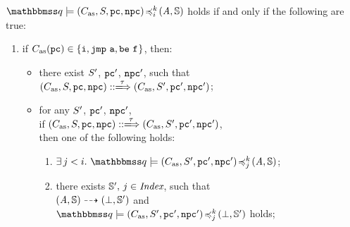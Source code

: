 \begin{definition}
    \label{def:sim-imp-prim-state}
    {\em $\simFunctionSt{\relastQ}{(\asmimp, \state, \pc, \npc)}{i}{k}{(\primcom, \hpstate)}$}
    holds if and only if the following are true:
    \small
    \begin{enumerate}[1.]
        \item if {\em $C_{\text{as}}(\texttt{pc}) \in \{ \texttt{i}, \texttt{jmp}{} \ \texttt{a}, \texttt{be} \ \texttt{f}_{} \}$}, then:
            \begin{itemize}
                \item there exist {\em $S'$}, {\em $\texttt{pc}'$}, {\em $\texttt{npc}'$},
                    such that \\
                    {\em $\LGlobTrans{(\asmimp, \state, \pc, \npc)}{\empmsg\,}
                            {(\asmimp, \state', \pc', \npc')}$};
                \item for any $S'$, {\em $\texttt{pc}'$}, {\em $\texttt{npc}'$}, \\
                    if
                    {\em $\LGlobTrans{(\asmimp, \state, \pc, \npc)}{\empmsg\,}
                            {(\asmimp, \state', \pc', \npc')}$}, \\ then one of
                        the following holds:
                    \begin{enumerate}
                        \item {\em $\exists \, j < i. \
                            \simFunctionSt{\relastQ}{(\asmimp, \state', \pc', \npc')}
                                {j}{k}{(\primcom, \hpstate)}$};
                        \item there exists $\mathbb{S}', \, j \in \textit{Index}$,
                            such that \\
                            ${(\textit{A}, \mathbb{S})} \dashrightarrow {(\perp, \mathbb{S}')}$
                            and \\
                            {\em $\simFunctionSt{\relastQ}{(\asmimp, \state', \pc', \npc')}
                                    {j}{k}{(\primdone, \hpstate')}$} holds;
                    \end{enumerate}
            \end{itemize}
            \vspace{0.5em}


\end{enumerate}
\end{definition}
